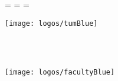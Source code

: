 \begin{titlepage}
  \oddsidemargin=\evensidemargin\relax
  \textwidth=\dimexpr{}\evensidemargin-2in\relax
  \hsize=\textwidth\relax

  \centering

  \vspace{0mm}
  \texttt{[image: logos/tumBlue]}

  \vspace{10mm}
  {\huge\MakeUppercase{\getFaculty{}}}\\
  {\large\MakeUppercase{\getUniversity{}}}\\

  \vspace{40mm}
  {\Large \getDoctype{}}

  \vspace{30mm}
  {\huge\bfseries \getTitle{}}

  \vspace{30mm}
  {\LARGE \getAuthor{}}

  \vspace{30mm}
  \texttt{[image: logos/facultyBlue]}
\end{titlepage}
